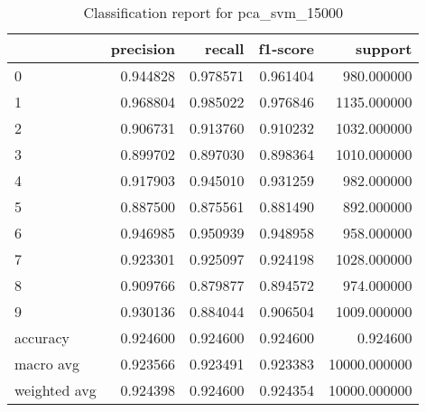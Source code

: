 \begin{table}[htb!]
\centering
\caption{Classification report for pca_svm_15000}
\label{tab:classification-report-pca_svm_15000}
\begin{tabular}{lrrrr}
\toprule
 & precision & recall & f1-score & support \\
\midrule
0 & 0.944828 & 0.978571 & 0.961404 & 980.000000 \\
1 & 0.968804 & 0.985022 & 0.976846 & 1135.000000 \\
2 & 0.906731 & 0.913760 & 0.910232 & 1032.000000 \\
3 & 0.899702 & 0.897030 & 0.898364 & 1010.000000 \\
4 & 0.917903 & 0.945010 & 0.931259 & 982.000000 \\
5 & 0.887500 & 0.875561 & 0.881490 & 892.000000 \\
6 & 0.946985 & 0.950939 & 0.948958 & 958.000000 \\
7 & 0.923301 & 0.925097 & 0.924198 & 1028.000000 \\
8 & 0.909766 & 0.879877 & 0.894572 & 974.000000 \\
9 & 0.930136 & 0.884044 & 0.906504 & 1009.000000 \\
accuracy & 0.924600 & 0.924600 & 0.924600 & 0.924600 \\
macro avg & 0.923566 & 0.923491 & 0.923383 & 10000.000000 \\
weighted avg & 0.924398 & 0.924600 & 0.924354 & 10000.000000 \\
\bottomrule
\end{tabular}
\end{table}
